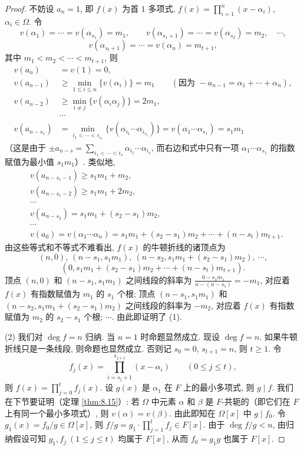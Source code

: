 \begin{proof}
不妨设 $a_n=1$, 即 $f(x)$ 为首 $1$ 多项式, $f(x)=\prod_{i=1}^{n}(x-\alpha_i)$, $\alpha_i\in\Omega$. 令
\[
  v(\alpha_1)=\cdots=v(\alpha_{s_1})=m_1,\qquad v(\alpha_{s_1+1})=\cdots=v(\alpha_{s_2})=m_2,\quad\cdots,
\]
\[
  v(\alpha_{s_t+1})=\cdots=v(\alpha_n)=m_{t+1},
\]
其中 $m_1<m_2<\cdots<m_{t+1}$, 则
\begin{align*}
  v(a_n)&=v(1)=0,\\
  v(a_{n-1})&\geqslant\min_{1\leqslant i\leqslant n}\{v(\alpha_i)\}=m_1\qquad(\text{因为 } -a_{n-1}=\alpha_1+\cdots+\alpha_n),\\
  v(a_{n-2})&\geqslant\min_{i\neq j}\{v(\alpha_i\alpha_j)\}=2m_1,\\
  &\cdots\\
  v(a_{n-s_1})&=\min_{i_1<\cdots<i_{s_1}}\{v(\alpha_{i_1}\cdots\alpha_{i_{s_1}})\}=v(\alpha_1\cdots\alpha_{s_1})=s_1m_1
\end{align*}
（这是由于 $\pm a_{n-s}=\sum_{i_1<\cdots<i_s}\alpha_{i_1}\cdots\alpha_{i_s}$, 而右边和式中只有一项 $\alpha_1\cdots\alpha_{s_1}$ 的指数赋值为最小值 $s_1m_1$）. 类似地,
\begin{align*}
  &v(a_{n-s_1-1})\geqslant s_1m_1+m_2,\\
  &v(a_{n-s_1-2})\geqslant s_1m_1+2m_2,\\
  &\cdots\\
  &v(a_{n-s_2})=s_1m_1+(s_2-s_1)m_2,\\
  &\cdots\\
  &v(a_0)=v(\alpha_1\cdots\alpha_n)=s_1m_1+(s_2-s_1)m_2+\cdots+(n-s_t)m_{t+1}.
\end{align*}
由这些等式和不等式不难看出, $f(x)$ 的牛顿折线的诸顶点为
\[
  (n,0),\ (n-s_1,s_1m_1),\ (n-s_2,s_1m_1+(s_2-s_1)m_2),\ \cdots,
\]
\[
  (0,s_1m_1+(s_2-s_1)m_2+\cdots+(n-s_t)m_{t+1}).
\]
顶点 $(n,0)$ 和 $(n-s_1,s_1m_1)$ 之间线段的斜率为 $\frac{0-s_1m_1}{n-(n-s_1)}=-m_1$, 对应着 $f(x)$ 有指数赋值为 $m_1$ 的 $s_1$ 个根; 顶点 $(n-s_1,s_1m_1)$ 和 $(n-s_2,s_1m_1+(s_2-s_1)m_2)$ 之间线段的斜率为 $-m_2$, 对应着 $f(x)$ 有指数赋值为 $m_2$ 的 $s_2-s_1$ 个根; $\cdots$. 由此即证明了 (1).

(2) 我们对 $\deg f=n$ 归纳. 当 $n=1$ 时命题显然成立. 现设 $\deg f=n$. 如果牛顿折线只是一条线段, 则命题也显然成立. 否则记 $s_0=0$, $s_{t+1}=n$, 则 $t\geqslant 1$. 令
\[
  f_j(x)=\prod_{i=s_j+1}^{s_{j+1}}(x-\alpha_i)\qquad(0\leqslant j\leqslant t),
\]
则 $f(x)=\prod_{j=0}^{t}f_j(x)$. 设 $g(x)$ 是 $\alpha_1$ 在 $F$ 上的最小多项式, 则 $g\mid f$. 我们在下节要证明（定理 \ref{thm:8.15}）: 若 $\Omega$ 中元素 $\alpha$ 和 $\beta$ 是 $F$-共轭的（即它们在 $F$ 上有同一个最小多项式）, 则 $v(\alpha)=v(\beta)$. 由此即知在 $\Omega[x]$ 中 $g\mid f_0$. 令 $g_1(x)=f_0/g\in\Omega[x]$, 则 $f/g=g_1\cdot\prod_{j=1}^{t}f_j\in F[x]$. 由于 $\deg f/g<n$, 由归纳假设可知 $g_1,f_j\ (1\leqslant j\leqslant t)$ 均属于 $F[x]$, 从而 $f_0=g_1g$ 也属于 $F[x]$.
\end{proof}

